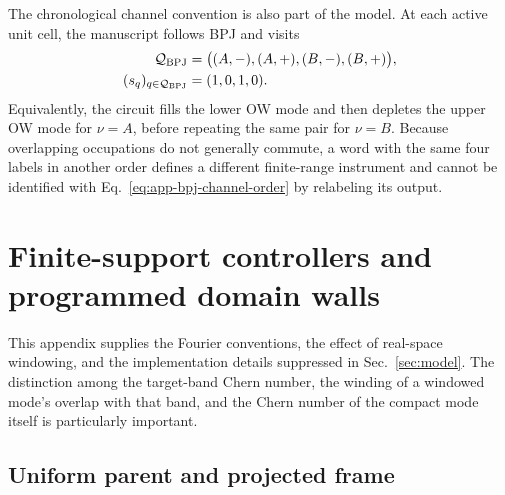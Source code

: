 The chronological channel convention is also part of the model.  At each
active unit cell, the manuscript follows BPJ and visits
\begin{align}
    \mathcal Q_{\rm BPJ}
    &=\bigl((A,-),(A,+),(B,-),(B,+)\bigr),
    \nonumber\\
    (s_q)_{q\in\mathcal Q_{\rm BPJ}}&=(1,0,1,0).
    \label{eq:app-bpj-channel-order}
\end{align}
Equivalently, the circuit fills the lower OW mode and then depletes the upper
OW mode for \(\nu=A\), before repeating the same pair for \(\nu=B\).
Because overlapping occupations do not generally commute, a word with the
same four labels in another order defines a different finite-range
instrument and cannot be identified with Eq.~\eqref{eq:app-bpj-channel-order}
by relabeling its output.

\section{Finite-support controllers and programmed domain walls}
\label{app:finite-support-controller}

This appendix supplies the Fourier conventions, the effect of real-space
windowing, and the implementation details suppressed in Sec.~\ref{sec:model}.
The distinction among the target-band Chern number, the winding of a
windowed mode's overlap with that band, and the Chern number of the compact
mode itself is particularly important.

\subsection{Uniform parent and projected frame}

